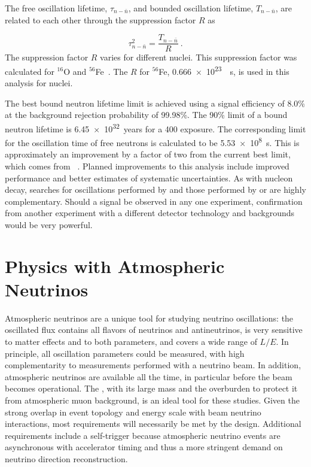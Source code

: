 The free \nnbar oscillation lifetime, $\tau_{n-\bar{n}}$, and bounded \nnbar oscillation lifetime, $T_{n-\bar{n}}$, are related to each other through the suppression factor $R$ as

\begin{equation}
    \tau^{2}_{n-\bar{n}} = \frac{T_{n-\bar{n}}}{R} ~.
    \label{eq:tau}
\end{equation}
The suppression factor $R$ varies for different nuclei. This suppression factor was calculated for $^{16}$O and $^{56}$Fe~\cite{Friedman:2008es}. The $R$ for $^{56}$Fe, \SI{0.666e23}{\per\s}, is used in this analysis for  nuclei.

The best bound neutron lifetime limit is achieved using a signal efficiency of \num{8.0}\% at the background rejection probability of \num{99.98}\%. The \num{90}\%  limit of a bound neutron lifetime is \SI{6.45e32}{years} for a \SI{400}{\ktyr} exposure. The corresponding limit for the oscillation time of free neutrons is calculated to be \SI{5.53e8}{\s}. This is approximately an improvement by a factor of two from the current best limit, which comes from \superk~\cite{Abe:2011ky}.  Planned improvements to this analysis include improved  performance and better estimates of systematic uncertainties.  As with nucleon decay, searches for \nnbar oscillations performed by  and those performed by \superk or \hyperk are highly complementary.  Should a signal be observed in any one experiment, confirmation from another experiment with a different detector technology and backgrounds would be very powerful. 

\section{Physics with Atmospheric Neutrinos}
\label{sec:nonaccel-atm}

Atmospheric neutrinos are a unique tool for studying neutrino oscillations: the oscillated flux contains all flavors of neutrinos and antineutrinos, is very sensitive to matter effects and to both \dm parameters, and covers a wide range of $L/E$. In principle, all oscillation parameters could be measured, with high
complementarity to measurements performed with a neutrino beam. In addition, atmospheric neutrinos are available all the time, in particular before the beam becomes operational. The  , with its large mass and the overburden to protect it from atmospheric muon background, is an ideal tool for these studies.  Given the strong overlap in event topology and energy scale with beam neutrino interactions, most requirements will necessarily be met by the  design. Additional requirements include a self-trigger because atmospheric neutrino events are asynchronous with accelerator timing and thus a more stringent demand on neutrino direction reconstruction.

